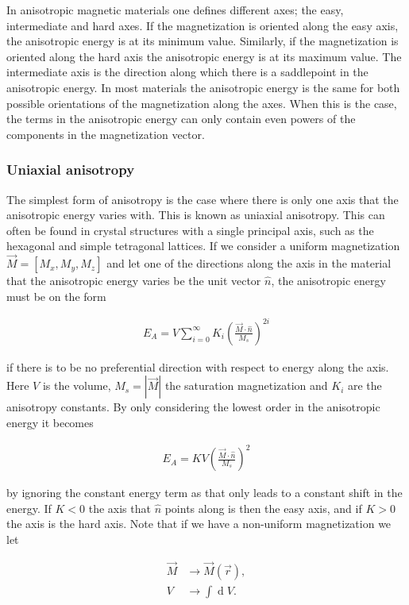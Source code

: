 \documentclass[1p]{elsarticle}		%
\renewcommand{\d}[1]{\ensuremath{\operatorname{d}\!{#1}}}
\begin{document}
In anisotropic magnetic materials one defines different axes; the easy, intermediate and hard axes. If the magnetization is oriented along the easy axis, the anisotropic energy is at its minimum value. Similarly, if the magnetization is oriented along the hard axis the anisotropic energy is at its maximum value. The intermediate axis is the direction along which there is a saddlepoint in the anisotropic energy. In most materials the anisotropic energy is the same for both possible orientations of the magnetization along the axes. When this is the case, the terms in the anisotropic energy can only contain even powers of the components in the magnetization vector.

\subsubsection{Uniaxial anisotropy}
The simplest form of anisotropy is the case where there is only one axis that the anisotropic energy varies with. This is known as uniaxial anisotropy. This can often be found in crystal structures with a single principal axis, such as the hexagonal and simple tetragonal lattices. If we consider a uniform magnetization $\vec{M} = \left[M_x, M_y, M_z\right]$ and let one of the directions along the axis in the material that the anisotropic energy varies be the unit vector $\hat{n}$, the anisotropic energy must be on the form

\begin{align}
\label{eq:uniaxialanisotropy}
E_A = V \sum_{i=0}^{\infty} K_i (\frac{\vec{M}\cdot\hat{n}}{M_s})^{2i}
\end{align}

if there is to be no preferential direction with respect to energy along the axis. Here $V$ is the volume, $M_s = |\vec{M}|$ the saturation magnetization and $K_i$ are the anisotropy constants. By only considering the lowest order in the anisotropic energy it becomes

\begin{align}
\label{eq:uniaxialanisotropy}
E_A = K V (\frac{\vec{M}\cdot\hat{n}}{M_s})^2
\end{align}

by ignoring the constant energy term as that only leads to a constant shift in the energy. If $K < 0$ the axis that $\hat{n}$ points along is then the easy axis, and if $K > 0$ the axis is the hard axis. Note that if we have a non-uniform magnetization we let

\begin{align*}
\vec{M} &\rightarrow \vec{M}(\vec{r}), \\
V &\rightarrow \int \d V.
\end{align*}
\end{document}
